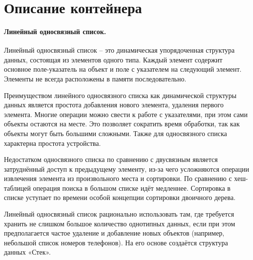 \section{Описание контейнера}

\paragraph{Линейный односвязный список.}


Линейный односвязный список – это динамическая упорядоченная структура данных, состоящая из элементов одного типа. Каждый элемент содержит основное поле-указатель на объект и поле с указателем на следующий элемент. Элементы не всегда расположены в памяти последовательно.

Преимуществом линейного односвязного списка как динамической структуры данных является простота добавления нового элемента, удаления первого элемента. Многие операции можно свести к работе с указателями, при этом сами объекты остаются на месте.
Это позволяет сократить время обработки, так как объекты могут быть большими сложными. Также для односвязного списка характерна простота устройства.

Недостатком односвязного списка по сравнению с двусвязным является затруднённый доступ к предыдущему элементу, из-за чего усложняются операции извлечения элемента из произвольного места и сортировки. По сравнению с хеш-таблицей операция поиска в большом списке идёт медленнее. Сортировка в списке уступает по времени особой концепции сортировки двоичного дерева.

Линейный односвязный список рационально использовать там, где требуется хранить не слишком большое количество однотипных данных, если при этом предполагается частое удаление и добавление новых объектов (например, небольшой список номеров телефонов). На его основе создаётся структура данных «Стек». 
